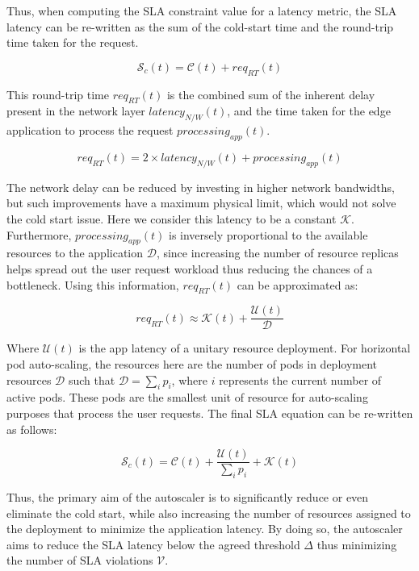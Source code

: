 Thus, when computing the SLA constraint value for a latency metric, the SLA latency can be re-written as the sum of the cold-start time and the round-trip time taken for the request.

\begin{equation}
    \mathcal{S}_{c}(t) = \mathcal{C}(t) + req_{RT}(t)
\end{equation}


This round-trip time $req_{RT}(t)$ is the combined sum of the inherent delay present in the network layer $latency_{N/W}(t)$, and the time taken for the edge application to process the request $processing_{app}(t)$.

\begin{equation}
    req_{RT}(t) = 2 \times latency_{N/W}(t) + processing_{app}(t)
\end{equation}

The network delay can be reduced by investing in higher network bandwidths, but such improvements have a maximum physical limit, which would not solve the cold start issue. Here we consider this latency to be a constant $\mathcal{K}$. Furthermore, $processing_{app}(t)$ is inversely proportional to the available resources to the application $\mathcal{D}$, since increasing the number of resource replicas helps spread out the user request workload thus reducing the chances of a bottleneck. Using this information, $req_{RT}(t)$ can be approximated as:

\begin{equation}
    req_{RT}(t) \approx \mathcal{K}(t) + \frac{\mathcal{U}(t)}{\mathcal{D}}
\end{equation}

Where $\mathcal{U}(t)$ is the app latency of a unitary resource deployment. For horizontal pod auto-scaling, the resources here are the number of pods in deployment resources $\mathcal{D}$ such that $\mathcal{D} = \sum_{i} p_{i}$, where $i$ represents the current number of active pods. These pods are the smallest unit of resource for auto-scaling purposes that process the user requests. The final SLA equation can be re-written as follows:

\begin{equation}
    \mathcal{S}_{c}(t) = \mathcal{C}(t) + \frac{\mathcal{U}(t)}{\sum_{i} p_{i}} + \mathcal{K}(t)
    \label{eqn:sla-cold-start}
\end{equation}

Thus, the primary aim of the autoscaler is to significantly reduce or even eliminate the cold start, while also increasing the number of resources assigned to the deployment to minimize the application latency. By doing so, the autoscaler aims to reduce the SLA latency below the agreed threshold $\Delta$ thus minimizing the number of SLA violations $\mathcal{V}$.\par

